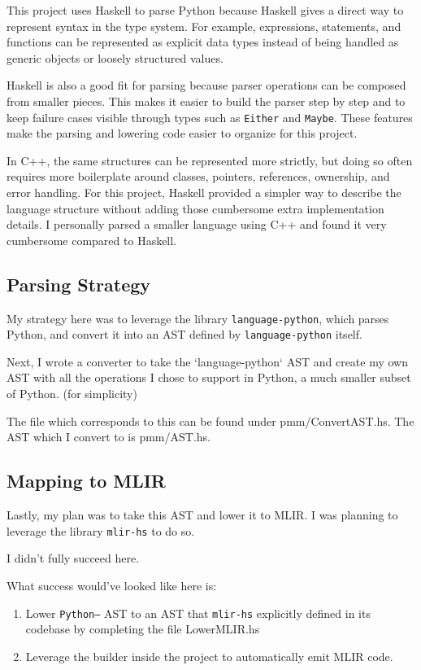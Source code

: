 \documentclass[11pt]{article}
\begin{document}
This project uses Haskell to parse Python because Haskell gives a direct way to
represent syntax in the type system. For example, expressions, statements, and
functions can be represented as explicit data types instead of being handled as
generic objects or loosely structured values.

Haskell is also a good fit for parsing because parser operations can be
composed from smaller pieces. This makes it easier to build the parser step by
step and to keep failure cases visible through types such as \texttt{Either}
and \texttt{Maybe}. These features make the parsing and lowering code easier to
organize for this project.

In C++, the same structures can be represented more strictly, but doing so
often requires more boilerplate around classes, pointers, references,
ownership, and error handling. For this project, Haskell provided a simpler way
to describe the language structure without adding those cumbersome extra
implementation details. I personally parsed a smaller language using C++ and
found it very cumbersome compared to Haskell.
\subsection{Parsing Strategy}
My strategy here was to leverage the library \texttt{language-python}, which
parses Python, and convert it into an AST defined by \texttt{language-python}
itself.

Next, I wrote a converter to take the `language-python` AST and create my own
AST with all the operations I chose to support in Python, a much smaller subset
of Python. (for simplicity)

The file which corresponds to this can be found under pmm/ConvertAST.hs. The
AST which I convert to is pmm/AST.hs.

\subsection{Mapping to MLIR}
Lastly, my plan was to take this AST and lower it to MLIR. I was planning to
leverage the library \texttt{mlir-hs} to do so.

I didn't fully succeed here.

What success would've looked like here is:

\begin{enumerate}
	\item Lower \texttt{Python--} AST to an AST that \texttt{mlir-hs} explicitly defined
	      in its codebase by completing the file LowerMLIR.hs
	\item Leverage the builder inside the project to automatically emit MLIR code.
\end{enumerate}
\end{document}
